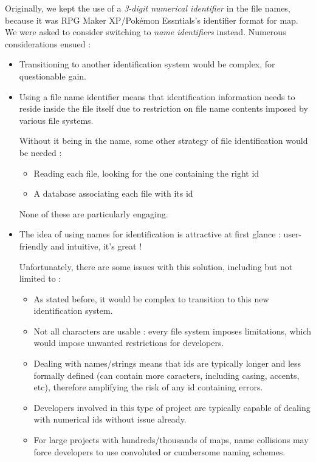 \documentclass[11pt]{article}
\begin{document}
{Originally, we kept the use of a \textit{3-digit numerical identifier} in the file names, because it was RPG Maker XP/Pokémon Essntials's identifier format for map. We were asked to consider switching to \textit{name identifiers} instead. Numerous considerations ensued :
\begin{itemize}
	\item Transitioning to another identification system would be complex, for questionable gain.
	
	\item Using a file name identifier means that identification information needs to reside inside the file itself due to restriction on file name contents imposed by various file systems.
	
	Without it being in the name, some other strategy of file identification would be needed :
	\begin{itemize}
		\item Reading each file, looking for the one containing the right id
		\item A database associating each file with its id
	\end{itemize}
	None of these are particularly engaging.
	
	\item The idea of using names for identification is attractive at first glance : user-friendly and intuitive, it's great !
	
	Unfortunately, there are some issues with this solution, including but not limited to :
	\begin{itemize}
		\item As stated before, it would be complex to transition to this new identification system.
		
		\item Not all characters are usable : every file system imposes limitations, which would impose unwanted restrictions for developers.
		
		\item Dealing with names/strings means that ids are typically longer and less formally defined (can contain more caracters, including casing, accents, etc), therefore amplifying the risk of any id containing errors.
		
		
		\item Developers involved in this type of project are typically capable of dealing with numerical ids without issue already.
		
		\item For large projects with hundreds/thousands of maps, name collisions may force developers to use convoluted or cumbersome naming schemes.
	\end{itemize}
	

\end{itemize}}
\end{document}
